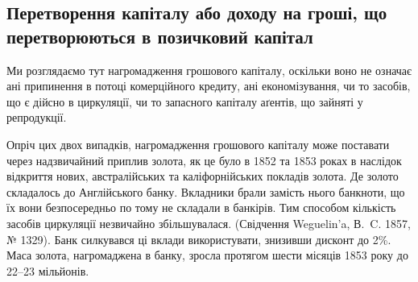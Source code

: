 \subsection{Перетворення капіталу або доходу на гроші, що перетворюються
в позичковий капітал}

Ми розглядаємо тут нагромадження грошового капіталу, оскільки воно не
означає ані припинення в потоці комерційного кредиту, ані економізування, чи
то засобів, що є дійсно в циркуляції, чи то запасного капіталу аґентів, що зайняті
у репродукції.

Опріч цих двох випадків, нагромадження грошового капіталу може поставати
через надзвичайний приплив золота, як це було в 1852 та 1853 роках
в наслідок відкриття нових, австралійських та каліфорнійських покладів золота.
Де золото складалось до Англійського банку. Вкладники брали замість нього
банкноти, що їх вони безпосередньо по тому не складали в банкірів. Тим способом
кількість засобів циркуляції незвичайно збільшувалася. (Свідчення Weguelin’a,
В.~C. 1857, № 1329). Банк силкувався ці вклади використувати, знизивши
дисконт до 2\%. Маса золота, нагромаджена в банку, зросла протягом
шести місяців 1853 року до 22--23 мільйонів.
